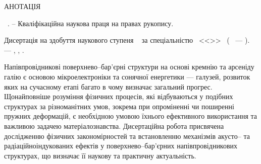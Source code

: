 \noindent
АНОТАЦІЯ						

\vspace{0.7cm}
\noindent
\thesisAuthorFIO~\thesisTitle. -- Кваліфікаційна наукова праця на правах рукопису.

\vspace{0.7cm}
\noindent
Дисертація на здобуття наукового ступеня \thesisDegree~
за спеціальністю \thesisSpecialtyNumber~<<\thesisSpecialtyTitle>>~
(\thesisKnowledgeNumber~ --- \thesisKnowledgeTitle). --- \thesisOrganization, \thesisCity, \thesisYear.

\vspace{0.7cm}

Напівпровідникові поверхнево--бар'єрні структури на основі кремнію та арсеніду галію є основою мікроелектроніки та сонячної енергетики --- галузей, розвиток яких на сучасному етапі багато в чому визначає загальний прогрес.
Щонайповніше розуміння фізичних процесів, які відбуваються у подібних структурах за різноманітних умов, зокрема при опроміненні чи поширенні пружних деформацій, є необхідною умовою їхнього ефективного використання та важливою задачею матеріалознавства.
Дисертаційна робота присвячена дослідженню фізичних  закономірностей  та встановленню механізмів акусто-- та радіаційноіндукованих ефектів у поверхнево--бар'єрних напівпровідникових структурах, що визначає її  наукову та практичну актуальність.


